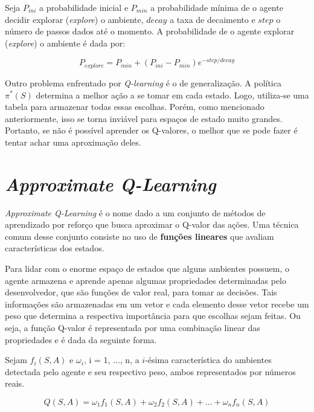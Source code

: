 Seja $P_{ini}$ a probabilidade inicial e $P_{min}$ a probabilidade mínima de o agente decidir explorar (\textit{explore}) o ambiente, $decay$ a taxa de decaimento e $step$ o número de passos dados até o momento.
A probabilidade de o agente explorar (\textit{explore}) o ambiente é dada por:

\begin{equation} \label{eq:exp_exp_prob}
P_{explore} = P_{min} + (P_{ini} - P_{min})e^{-step/decay}
\end{equation}

Outro problema enfrentado por \textit{Q-learning} é o de generalização.
A política $\pi^{*}(S)$ determina a melhor ação a se tomar em cada estado.
Logo, utiliza-se uma tabela para armazenar todas essas escolhas.
Porém, como mencionado anteriormente, isso se torna inviável para espaços de estado muito grandes.
Portanto, se não é possível aprender os Q-valores, o melhor que se pode fazer é tentar achar uma aproximação deles.


\section{\textit{Approximate Q-Learning}}
\label{sec:aql}

\textit{Approximate Q-Learning} é o nome dado a um conjunto de métodos de aprendizado por reforço que busca aproximar o Q-valor das ações.
Uma técnica comum desse conjunto consiste no uso de \textbf{funções lineares} que avaliam características dos estados.

Para lidar com o enorme espaço de estados que alguns ambientes possuem, o agente armazena e aprende apenas algumas propriedades determinadas pelo desenvolvedor, que são funções de valor real, para tomar as decisões.
Tais informações são armazenadas em um vetor e cada elemento desse vetor recebe um peso que determina a respectiva importância para que escolhas sejam feitas. Ou seja, a função Q-valor é representada por uma combinação linear das propriedades e é dada da seguinte forma.

Sejam $f_{i}(S,A)$ e $\omega_{i}$, i = 1, ..., n, a $i$-ésima característica do ambientes detectada pelo agente e seu respectivo peso, ambos representados por números reais.

\begin{equation} \label{eq:q_lin_comb}
Q(S,A) = \omega_{1}f_{1}(S,A) + \omega_{2}f_{2}(S,A) + ... + \omega_{n}f_{n}(S,A)
\end{equation}

